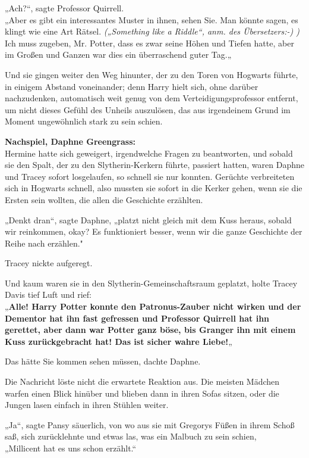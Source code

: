 {„Ach?“, sagte Professor Quirrell.\\ „Aber es gibt ein interessantes Muster in ihnen, sehen Sie. Man könnte sagen, es klingt wie eine Art Rätsel. \emph{(„Something like a Riddle“, anm. des Übersetzers:-) )}\\ Ich muss zugeben, Mr. Potter, dass es zwar seine Höhen und Tiefen hatte, aber im Großen und Ganzen war dies ein überraschend guter Tag.„

Und sie gingen weiter den Weg hinunter, der zu den Toren von Hogwarts führte, in einigem Abstand voneinander; denn Harry hielt sich, ohne darüber nachzudenken, automatisch weit genug von dem Verteidigungsprofessor entfernt, um nicht dieses Gefühl des Unheils auszulösen, das aus irgendeinem Grund im Moment ungewöhnlich stark zu sein schien.

\textbf{Nachspiel, Daphne Greengrass:}\\ Hermine hatte sich geweigert, irgendwelche Fragen zu beantworten, und sobald sie den Spalt, der zu den Slytherin-Kerkern führte, passiert hatten, waren Daphne und Tracey sofort losgelaufen, so schnell sie nur konnten. Gerüchte verbreiteten sich in Hogwarts schnell, also mussten sie sofort in die Kerker gehen, wenn sie die Ersten sein wollten, die allen die Geschichte erzählten.

„Denkt dran“, sagte Daphne, „platzt nicht gleich mit dem Kuss heraus, sobald wir reinkommen, okay? Es funktioniert besser, wenn wir die ganze Geschichte der Reihe nach erzählen."

Tracey nickte aufgeregt.

Und kaum waren sie in den Slytherin-Gemeinschaftsraum geplatzt, holte Tracey Davis tief Luft und rief:\\ „\textbf{Alle! Harry Potter konnte den Patronus-Zauber nicht wirken und der Dementor hat ihn fast gefressen und Professor Quirrell hat ihn gerettet, aber dann war Potter ganz böse, bis Granger ihn mit einem Kuss zurückgebracht hat! Das ist sicher wahre Liebe!}„

Das hätte Sie kommen sehen müssen, dachte Daphne.

Die Nachricht löste nicht die erwartete Reaktion aus. Die meisten Mädchen warfen einen Blick hinüber und blieben dann in ihren Sofas sitzen, oder die Jungen lasen einfach in ihren Stühlen weiter.

„Ja“, sagte Pansy säuerlich, von wo aus sie mit Gregorys Füßen in ihrem Schoß saß, sich zurücklehnte und etwas las, was ein Malbuch zu sein schien,\\ „Millicent hat es uns schon erzählt.“

}
